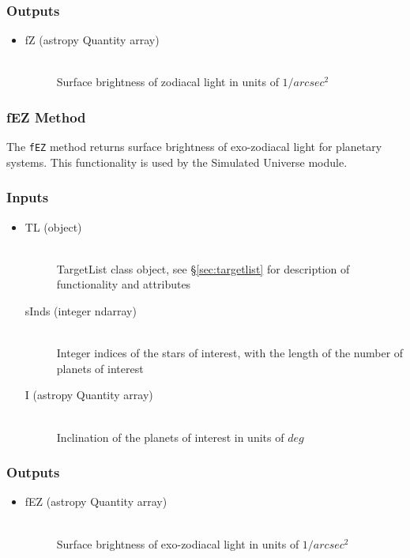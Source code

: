 \documentclass[cleanfoot]{asme2ej}
\begin{document}
\subsubsection*{Outputs}
\begin{itemize}
    \item 
    \begin{description}
        \item[fZ (astropy Quantity array)] \hfill \\ Surface brightness of zodiacal light in units of $ 1/arcsec^2 $
    \end{description}
\end{itemize}

\subsubsection{fEZ Method} \label{sec:fEZtask}
The \verb+fEZ+ method returns surface brightness of exo-zodiacal light for planetary systems.  This functionality is used by the Simulated Universe module.

\subsubsection*{Inputs}
\begin{itemize}
    \item 
    \begin{description}
        \item[TL (object)] \hfill \\ TargetList class object, see \S\ref{sec:targetlist} for description of functionality and attributes       
        \item[sInds (integer ndarray)] \hfill \\ Integer indices of the stars of interest, with the length of the number of planets of interest
        \item[I (astropy Quantity array)] \hfill \\ Inclination of the planets of interest in units of $ deg $
    \end{description}
\end{itemize}

\subsubsection*{Outputs}
\begin{itemize}
    \item 
    \begin{description}
        \item[fEZ (astropy Quantity array)] \hfill \\
        Surface brightness of exo-zodiacal light in units of $ 1/arcsec^2 $
    \end{description}
\end{itemize}
\end{document}
